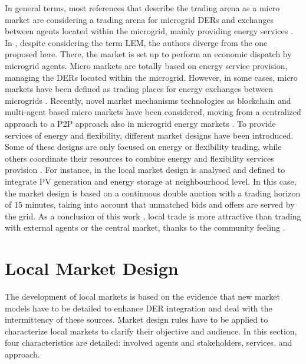 In general terms, most references that describe the trading arena as a micro market are considering a trading arena for microgrid DERs and exchanges between agents located within the microgrid, mainly providing energy services \cite{faber2014micro, lane2013costing, block2008market, cox2011energy, sikdar2013microgrid, cui2014electricity, densmore2015energy, Heidari2018}. In \cite{shamsi2015economic}, despite considering the term LEM, the authors diverge from the one proposed here. There, the market is set up to perform an economic dispatch by microgrid agents. Micro markets are totally based on energy service provision, managing the DERs located within the microgrid. However, in some cases, micro markets have been defined as trading places for energy exchanges between microgrids \cite{menniti2014future}. Recently, novel market mechanisms technologies as blockchain and multi-agent based micro markets have been considered, moving from a centralized approach to a P2P approach also in microgrid energy markets \cite{Kounelis2017Fostering}. To provide services of energy and flexibility, different market designs have been introduced. Some of these designs are only focused on energy or flexibility trading, while others coordinate their resources to combine energy and flexibility services provision \cite{vytelingum2010trading, sikdar2013microgrid, Bayram2014}. For instance, in \cite{ampatzis2014local} the local market design is analysed and defined to integrate PV generation and energy storage at neighbourhood level. In this case, the market design is based on a continuous double auction with a trading horizon of 15 minutes, taking into account that unmatched bids and offers are served by the grid. As a conclusion of this work \cite{ampatzis2014local}, local trade is more attractive than trading with external agents or the central market, thanks to the community feeling \cite{Pinson2017}. 

\section{Local Market Design} \label{sec:design}
The development of local markets is based on the evidence that new market models have to be detailed to enhance DER integration and deal with the intermittency of these sources. Market design rules have to be applied to characterize local markets to clarify their objective and audience. In this section, four characteristics are detailed: involved agents and stakeholders, services, and approach.


